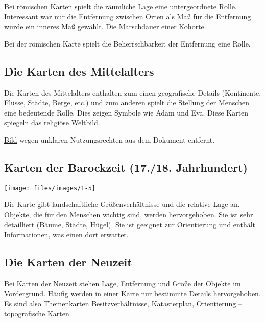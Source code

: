 Bei römischen Karten spielt die räumliche Lage eine untergeordnete Rolle.
Interessant war nur die Entfernung zwischen Orten als Maß für die Entfernung wurde ein inneres Maß gewählt.
Die Marschdauer einer Kohorte.

Bei der römischen Karte spielt die Beherrschbarkeit der Entfernung eine Rolle.

\subsection{Die Karten des Mittelalters}
\begin{minipage}{7cm}
Die Karten des Mittelalters enthalten zum einen geografische Details (Kontinente, Flüsse, Städte, Berge, etc.)
und zum anderen spielt die Stellung der Menschen eine bedeutende Rolle.
Dies zeigen Symbole wie \zB Adam und Eva.
Diese Karten spiegeln das religiöse Weltbild.
\end{minipage}
\hfill
\begin{minipage}{8cm}
\href{http://bp1.blogger.com/_gtm0kekxq3U/RhGmLp80wJI/AAAAAAAAADk/cqx1knC8TiY/s320/beatus+wrold+map_spain.JPG}%
{Bild} wegen unklaren Nutzungsrechten aus dem Dokument entfernt.
\end{minipage}

\subsection{Karten der Barockzeit (17./18. Jahrhundert)}
\begin{minipage}{8cm}
	\texttt{[image: files/images/1-5]}
\end{minipage}
\hfill
\begin{minipage}{8cm}
Die Karte gibt landschaftliche Größenverhältnisse und die relative Lage an.
Objekte, die für den Menschen wichtig sind, werden hervorgehoben.
Sie ist sehr detailliert (Bäume, Städte, Hügel).
Sie ist geeignet zur Orientierung und enthält Informationen, was einen dort erwartet.
\end{minipage}

\subsection{Die Karten der Neuzeit}
\begin{figure}[h!]
	\hfill
\end{figure}
Bei Karten der Neuzeit stehen Lage, Entfernung und Größe der Objekte im Vordergrund.
Häufig werden in einer Karte nur bestimmte Details hervorgehoben.
Es sind also Themenkarten \zB Besitzverhältnisse, Katasterplan, Orientierung --
topografische Karten.

